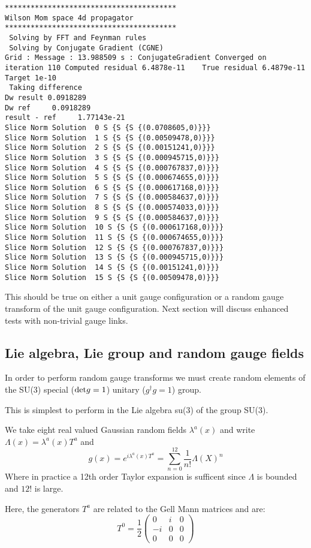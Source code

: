 \documentclass[letter,10pt]{report}
\begin{document}
\begin{verbatim}
****************************************
Wilson Mom space 4d propagator 
****************************************
 Solving by FFT and Feynman rules
 Solving by Conjugate Gradient (CGNE)
Grid : Message : 13.988509 s : ConjugateGradient Converged on iteration 110	Computed residual 6.4878e-11	True residual 6.4879e-11	Target 1e-10
 Taking difference
Dw result 0.0918289
Dw ref     0.0918289
result - ref     1.77143e-21
Slice Norm Solution  0 S {S {S {(0.0708605,0)}}}
Slice Norm Solution  1 S {S {S {(0.00509478,0)}}}
Slice Norm Solution  2 S {S {S {(0.00151241,0)}}}
Slice Norm Solution  3 S {S {S {(0.000945715,0)}}}
Slice Norm Solution  4 S {S {S {(0.000767837,0)}}}
Slice Norm Solution  5 S {S {S {(0.000674655,0)}}}
Slice Norm Solution  6 S {S {S {(0.000617168,0)}}}
Slice Norm Solution  7 S {S {S {(0.000584637,0)}}}
Slice Norm Solution  8 S {S {S {(0.000574033,0)}}}
Slice Norm Solution  9 S {S {S {(0.000584637,0)}}}
Slice Norm Solution  10 S {S {S {(0.000617168,0)}}}
Slice Norm Solution  11 S {S {S {(0.000674655,0)}}}
Slice Norm Solution  12 S {S {S {(0.000767837,0)}}}
Slice Norm Solution  13 S {S {S {(0.000945715,0)}}}
Slice Norm Solution  14 S {S {S {(0.00151241,0)}}}
Slice Norm Solution  15 S {S {S {(0.00509478,0)}}}
\end{verbatim}


This should be true on either a unit gauge configuration or a random gauge transform of the unit gauge configuration.
Next section will discuss enhanced tests with non-trivial gauge links.

\subsection{Lie algebra, Lie group and random gauge fields}

In order to perform random gauge transforms we must create random elements of the SU(3) special (${\rm det}g=1$) unitary ($g^\dagger g = 1$) group.

This is simplest to perform in the Lie algebra su(3) of the group SU(3).

We take eight real valued Gaussian random fields $\lambda^a(x)$ and write $\Lambda(x) = \lambda^a(x) T^a$
and
$$
g(x) = e^{i\lambda^a(x) T^a} = \sum_{n=0}^{12} \frac{1}{n!} \Lambda(X)^n 
$$
Where in practice a 12th order Taylor expansion is sufficent since $\Lambda$ is bounded and $12 !$ is large.

Here, the generators $T^a$ are related to the Gell Mann matrices and are:
$$
T^0 =
\frac{1}{2} \left(
\begin{array}{ccc}
0  & i & 0 \\
-i  & 0 & 0\\
0  & 0 & 0
  \end{array}\right)
$$
\end{document}
